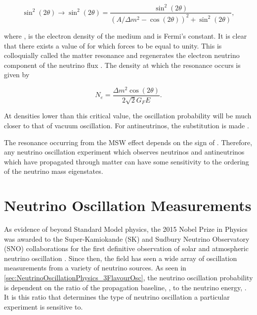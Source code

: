 \begin{equation}
  \label{eq:NeutrinoOscillationPhysics_2Flavour_MSW}
  \sin^{2}(2\theta) \rightarrow \sin^{2}(2\theta) = \frac{\sin^{2}(2\theta)}{(A/\Delta m^{2} - \cos(2\theta))^{2} + \sin^{2}(2\theta)},
\end{equation}

where ,  is the electron density of the medium and  is Fermi's constant. It is clear that there exists a value of  for  which forces  to be equal to unity. This is colloquially called the matter resonance and regenerates the electron neutrino component of the neutrino flux \cite{Smirnov2003-yb, msw, wolfenstein}. The density at which the resonance occurs is given by

\begin{equation}
  \label{eq:NeutrinoOscillationPhysics_ResonanceDensity}
  N_{e} = \frac{\Delta m^{2} \cos(2\theta)}{2\sqrt{2} G_{F} E}.
\end{equation}

At densities lower than this critical value, the oscillation probability will be much closer to that of vacuum oscillation. For antineutrinos, the  substitution is made \cite{Barger:1980tf}.

The resonance occurring from the MSW effect depends on the sign of . Therefore, any neutrino oscillation experiment which observes neutrinos and antineutrinos which have propagated through matter can have some sensitivity to the ordering of the neutrino mass eigenstates.

\section{Neutrino Oscillation Measurements}
\label{sec:NeutrinoOscillationPhysics_OscillationMeasurements}

As evidence of beyond Standard Model physics, the 2015 Nobel Prize in Physics was awarded to the Super-Kamiokande (SK) \cite{PhysRevLett.93.101801} and Sudbury Neutrino Observatory (SNO) \cite{PhysRevLett.89.011301} collaborations for the first definitive observation of solar and atmospheric neutrino oscillation \cite{2015NobelPhysicsPrize}. Since then, the field has seen a wide array of oscillation measurements from a variety of neutrino sources. As seen in \autoref{sec:NeutrinoOscillationPhysics_3FlavourOsc}, the neutrino oscillation probability is dependent on the ratio of the propagation baseline, , to the neutrino energy, . It is this ratio that determines the type of neutrino oscillation a particular experiment is sensitive to.

